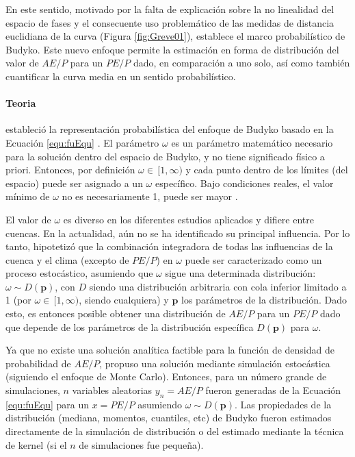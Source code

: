 \documentclass[12pt]{article}
\begin{document}


En este sentido, \citet{Greve2015} motivado por la falta de explicación sobre la no linealidad del espacio de fases y el consecuente uso problemático de las medidas de distancia euclidiana de la curva (Figura \ref{fig:Greve01}), establece el marco probabilístico de Budyko. Este nuevo enfoque permite la estimación en forma de distribución del valor de $AE/P$ para un $PE/P$ dado, en comparación a uno solo, así como también cuantificar la curva media en un sentido probabilístico.

\paragraph{Teoria}\mbox{}

\citet{Greve2015} estableció la representación probabilística del enfoque de Budyko basado en la Ecuación \ref{equ:fuEqu} \citep{Fu1981}. El parámetro $\omega$ es un parámetro matemático necesario para la solución dentro del espacio de Budyko, y no tiene significado físico a priori. Entonces, por definición $\omega \in\,[1,\infty)$ y cada punto dentro de los límites (del espacio) puede ser asignado a un $\omega$ específico. Bajo condiciones reales, el valor mínimo de $\omega$ no es necesariamente 1, puede ser mayor \citep{Zhang2004}. 

\thispagestyle{empty}

El valor de $\omega$ es diverso en los diferentes estudios aplicados y difiere entre cuencas. En la actualidad, aún no se ha identificado su principal influencia. Por lo tanto, \citet{Greve2015} hipotetizó que la combinación integradora de todas las influencias de la cuenca y el clima (excepto de $PE/P$) en $\omega$ puede ser caracterizado como un proceso estocástico, asumiendo que $\omega$ sigue una determinada distribución: $\omega \sim D(\textbf{p})$, con $D$ siendo una distribución arbitraria con cola inferior limitado a 1 (por $\omega \in\,[1,\infty)$, siendo cualquiera) y $\textbf{p}$ los parámetros de la distribución. Dado esto, es entonces posible obtener una distribución de $AE/P$ para un $PE/P$ dado que depende de los parámetros de la distribución específica $D(\textbf{p})$ para $\omega$.

Ya que no existe una solución analítica factible para la función de densidad de probabilidad de $AE/P$, \citet{Greve2015} propuso una solución mediante simulación estocástica (siguiendo el enfoque de Monte Carlo). Entonces, para un número grande de simulaciones, $n$ variables aleatorias $y_{n} = AE/P$ fueron generadas de la Ecuación \ref{equ:fuEqu} para un $x = PE/P$ asumiendo $\omega \sim D(\textbf{p})$. Las propiedades de la distribución (mediana, momentos, cuantiles, etc) de Budyko fueron estimados directamente de la simulación de distribución o del estimado mediante la técnica de kernel (si el $n$ de simulaciones fue pequeña).
\end{document}
